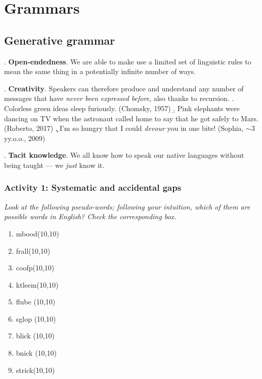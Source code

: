 \documentclass[11pt, oneside]{article}   	%
\begin{document}
\section{Grammars}

\subsection{Generative grammar}

\ex. {\bfseries Open-endedness}. We are able to make use a limited set of linguistic rules to mean the same thing in a potentially infinite number of ways.

\ex. {\bfseries Creativity}. Speakers can therefore produce and understand any number of messages that have {\itshape never been expressed before}, also thanks to recursion.
\a. Colorless green ideas sleep furiously. (Chomsky, 1957)
\b. Pink elephants were dancing on TV when the astronaut called home to say that he got safely to Mars. (Roberto, 2017)
\c. I'm so hungry that I could {\itshape devour} you in one bite! (Sophia, $\sim$3 yy.o.o., 2009)

\ex. {\bfseries Tacit knowledge}. We all know how to speak our native languages without being taught --- we {\itshape just }know it. 

\subsubsection{Activity 1: Systematic and accidental gaps}

{\itshape Look at the following pseudo-words; following your intuition, which of them are possible words in English? Check the corresponding box.}

\parbox{.5\textwidth}{%
   \begin{enumerate}
    \item mbood\hfill \framebox(10,10){}
    \item frall\hfill \framebox(10,10){}
    \item coofp\hfill \framebox(10,10){}
    \item ktleem\hfill \framebox(10,10){}
    \item flube \hfill \framebox(10,10){}
    \item sglop \hfill \framebox(10,10){}
    \item blick \hfill \framebox(10,10){}
    \item bnick \hfill \framebox(10,10){}
    \item strick\hfill \framebox(10,10){}
    \end{enumerate}%
}
\end{document}
